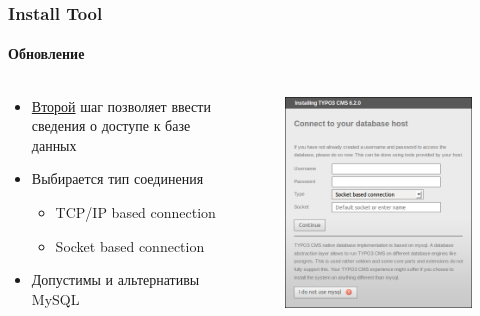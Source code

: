 
\begin{frame}[fragile]
	\frametitle{Install Tool}
	\framesubtitle{Обновление}

	\begin{columns}[T]

		\begin{column}{.5\textwidth}
			\begin{itemize}
				\item \underline{Второй} шаг позволяет ввести сведения о доступе к базе данных
				\item Выбирается тип соединения
					\begin{itemize}
						\item TCP/IP based connection
						\item Socket based connection
					\end{itemize}
				\item Допустимы и альтернативы MySQL
			\end{itemize}
		\end{column}

		\begin{column}{.5\textwidth}
			\begin{figure}\vspace*{-0.4cm}
				\includegraphics[width=0.8\linewidth]{Images/InstallTool/DatabaseConnectionDetails.png}
			\end{figure}
		\end{column}

	\end{columns}

\end{frame}

